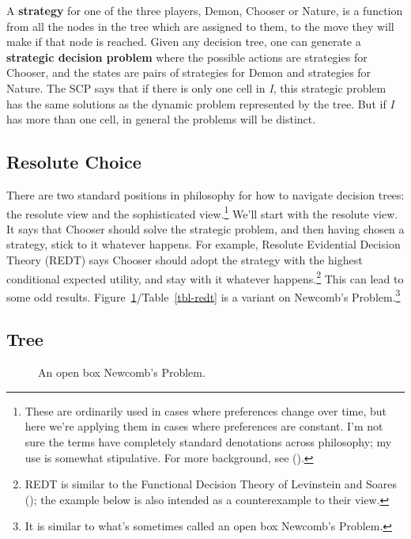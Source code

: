 \documentclass[
  10pt,
  letterpaper,
  DIV=11,
  numbers=noendperiod,
  twoside]{scrartcl}
\begin{document}
A \textbf{strategy} for one of the three players, Demon, Chooser or
Nature, is a function from all the nodes in the tree which are assigned
to them, to the move they will make if that node is reached. Given any
decision tree, one can generate a \textbf{strategic decision problem}
where the possible actions are strategies for Chooser, and the states
are pairs of strategies for Demon and strategies for Nature. The SCP
says that if there is only one cell in \emph{I}, this strategic problem
has the same solutions as the dynamic problem represented by the tree.
But if \emph{I} has more than one cell, in general the problems will be
distinct.

\subsection{Resolute Choice}\label{sec-resolute}

There are two standard positions in philosophy for how to navigate
decision trees: the resolute view and the sophisticated view.\footnote{These
  are ordinarily used in cases where preferences change over time, but
  here we're applying them in cases where preferences are constant. I'm
  not sure the terms have completely standard denotations across
  philosophy; my use is somewhat stipulative. For more background, see
  ().} We'll start with
the resolute view. It says that Chooser should solve the strategic
problem, and then having chosen a strategy, stick to it whatever
happens. For example, Resolute Evidential Decision Theory (REDT) says
Chooser should adopt the strategy with the highest conditional expected
utility, and stay with it whatever happens.\footnote{REDT is similar to
  the Functional Decision Theory of Levinstein and Soares
  (); the example below is also
  intended as a counterexample to their view.} This can lead to some odd
results. Figure~\ref{fig-redt}/Table~\ref{tbl-redt} is a variant on
Newcomb's Problem.\footnote{It is similar to what's sometimes called an
  open box Newcomb's Problem.}

\subsection{Tree}

\begin{figure}


\caption{\label{fig-redt}An open box Newcomb's Problem.}

\end{figure}%
\end{document}
